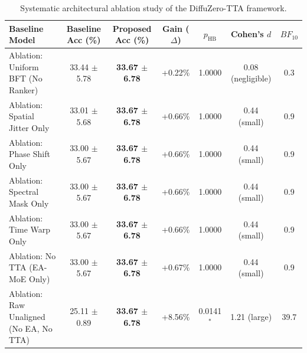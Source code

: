 \begin{table}[t]
\centering
\small
\caption{Systematic architectural ablation study of the DiffuZero-TTA framework.}
\label{tab:paper2_statistical_benchmarks}
\begin{tabular}{lcccccc}
\toprule
\textbf{Baseline Model} & \textbf{Baseline Acc (\%)} & \textbf{Proposed Acc (\%)} & \textbf{Gain ($\Delta$)} & \textbf{$p_{\text{HB}}$} & \textbf{Cohen's $d$} & \textbf{$BF_{10}$} \\
\midrule
Ablation: Uniform BFT (No Ranker) & 33.44 $\pm$ 5.78 & \textbf{33.67 $\pm$ 6.78} & +0.22\% & 1.0000 & 0.08 (negligible) & 0.3 \\
Ablation: Spatial Jitter Only & 33.01 $\pm$ 5.68 & \textbf{33.67 $\pm$ 6.78} & +0.66\% & 1.0000 & 0.44 (small) & 0.9 \\
Ablation: Phase Shift Only & 33.00 $\pm$ 5.67 & \textbf{33.67 $\pm$ 6.78} & +0.66\% & 1.0000 & 0.44 (small) & 0.9 \\
Ablation: Spectral Mask Only & 33.00 $\pm$ 5.67 & \textbf{33.67 $\pm$ 6.78} & +0.66\% & 1.0000 & 0.44 (small) & 0.9 \\
Ablation: Time Warp Only & 33.00 $\pm$ 5.67 & \textbf{33.67 $\pm$ 6.78} & +0.66\% & 1.0000 & 0.44 (small) & 0.9 \\
Ablation: No TTA (EA-MoE Only) & 33.00 $\pm$ 5.67 & \textbf{33.67 $\pm$ 6.78} & +0.67\% & 1.0000 & 0.44 (small) & 0.9 \\
Ablation: Raw Unaligned (No EA, No TTA) & 25.11 $\pm$ 0.89 & \textbf{33.67 $\pm$ 6.78} & +8.56\% & 0.0141$^{*}$ & 1.21 (large) & 39.7 \\
\bottomrule
\end{tabular}
\end{table}
